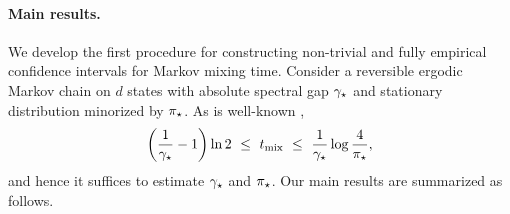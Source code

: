 \paragraph{Main results.}
We develop the first 
procedure for constructing non-trivial
and fully empirical confidence intervals for Markov mixing time.
Consider a reversible ergodic Markov chain on $d$ states with absolute
spectral gap $\gamma_{\star}$ and stationary distribution minorized by $\pi_{\star}$. 
As is well-known \citep[Theorems~12.3 and~12.4]{LePeWi08},
\begin{equation}
  \label{eq:mixing-time-bound}
  \left(\frac1{\gamma_{\star}} - 1\right) \ln2
  \ \leq \ t_{\operatorname{mix}}
  \ \leq \ \frac1{\gamma_{\star}} \log \frac4{\pi_{\star}}
  ,
\end{equation}
and hence it suffices to estimate $\gamma_{\star}$ and $\pi_{\star}$. 
Our main results are summarized as follows.
